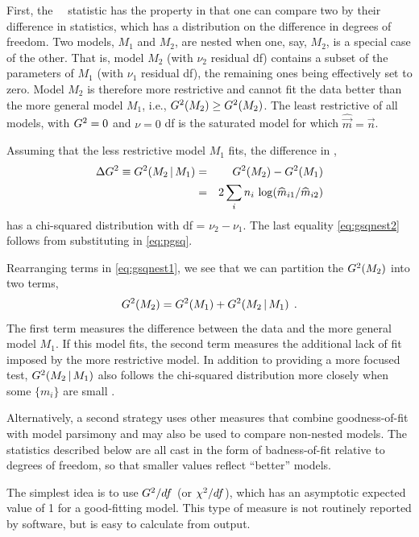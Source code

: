 \documentclass[11pt]{book}\usepackage[]{graphicx}\usepackage[]{color}
\begin{document}
First, the \LR\ \GSQ\ statistic has the property
in that one can compare two
 by their difference in \GSQ statistics,
which has a \chisq distribution on the difference in degrees of
freedom.
Two models, $M_1$ and $M_2$, are nested when one, say, $M_2$, is
a special case of the other.  That is, model $M_2$ (with $\nu_2$ residual df)
contains a subset of
the parameters of $M_1$ (with $\nu_1$ residual df),
the remaining ones being effectively set to zero.
Model $M_2$ is therefore more restrictive and cannot fit the data better
than the more general model $M_1$, i.e., $G^2 (M_2) \ge G^2 (M_2)$.
The least restrictive of all models, with $G^2 = 0$ and $\nu=0$ df is
the saturated model for which $\widehat{\vec{m}} = \vec{n}$.

Assuming that the less restrictive model $M_1$ fits, the difference in
\GSQ,
\begin{eqnarray}
\Delta G^2 \equiv G^2 ( M_2 \, | \, M_1 )
& = & G^2 ( M_2 ) - G^2 ( M_1 ) \label{eq:gsqnest1} \\
& = & 2 \sum_i n_i \, \log ( \widehat{m}_{i1} / \widehat{m}_{i2} ) \label{eq:gsqnest2}
\end{eqnarray}
has a chi-squared distribution with df = $\nu_2 - \nu_1$.
The last equality \eqref{eq:gsqnest2} follows from substituting in \eqref{eq:pgsq}.

Rearranging terms in \eqref{eq:gsqnest1}, we see that we can partition
the $G^2 ( M_2 )$ into two terms,
\begin{equation*}
G^2 ( M_2 ) = G^2 ( M_1 ) + G^2 ( M_2 \, | \, M_1 )
\:\: .
\end{equation*}
The first term measures the difference between the data and the more
general model $M_1$.  If this model fits, the second term measures the
additional lack of fit imposed by the more restrictive model.
In addition to providing a more focused test, $G^2 ( M_2 \, | \, M_1 )$
also follows the chi-squared distribution more closely when some
$\{ m_i \}$ are small
\citep[\S 10.6.3]{Agresti:2013}.

Alternatively, a second strategy uses other measures that combine
goodness-of-fit with model parsimony and may also be used to compare
non-nested models.  The statistics described below are all cast in
the form of badness-of-fit relative to degrees of freedom, so that
smaller values reflect ``better'' models.

The simplest idea \citep{Goodman:71}
is to use $G^2 / df$
(or $\chi^2 / df$), which has an asymptotic expected value of 1 for a good-fitting
model.  This type of measure is not routinely reported by \R software, but is
easy to calculate from output.
\end{document}
